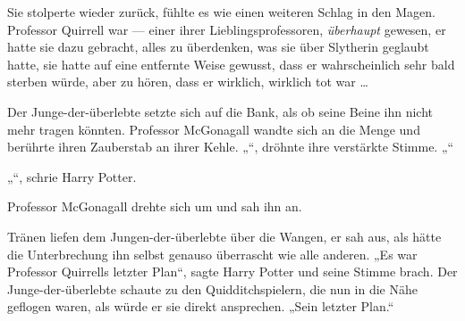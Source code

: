 Sie stolperte wieder zurück, fühlte es wie einen weiteren Schlag in den Magen.
Professor Quirrell war — einer ihrer Lieblingsprofessoren, \emph{überhaupt} gewesen, er hatte sie dazu gebracht, alles zu überdenken, was sie über Slytherin geglaubt hatte, sie hatte auf eine entfernte Weise gewusst, dass er wahrscheinlich sehr bald sterben würde, aber zu hören, dass er wirklich, wirklich tot war …

Der Junge-der-überlebte setzte sich auf die Bank, als ob seine Beine ihn nicht mehr tragen könnten.
Professor McGonagall wandte sich an die Menge und berührte ihren Zauberstab an ihrer Kehle.
„“, dröhnte ihre verstärkte Stimme.
„“

„“, schrie Harry Potter.

Professor McGonagall drehte sich um und sah ihn an.

Tränen liefen dem Jungen-der-überlebte über die Wangen, er sah aus, als hätte die Unterbrechung ihn selbst genauso überrascht wie alle anderen.
„Es war Professor Quirrells letzter Plan“, sagte Harry Potter und seine Stimme brach. Der Junge-der-überlebte schaute zu den Quidditchspielern, die nun in die Nähe geflogen waren, als würde er sie direkt ansprechen.
„Sein letzter Plan.“

